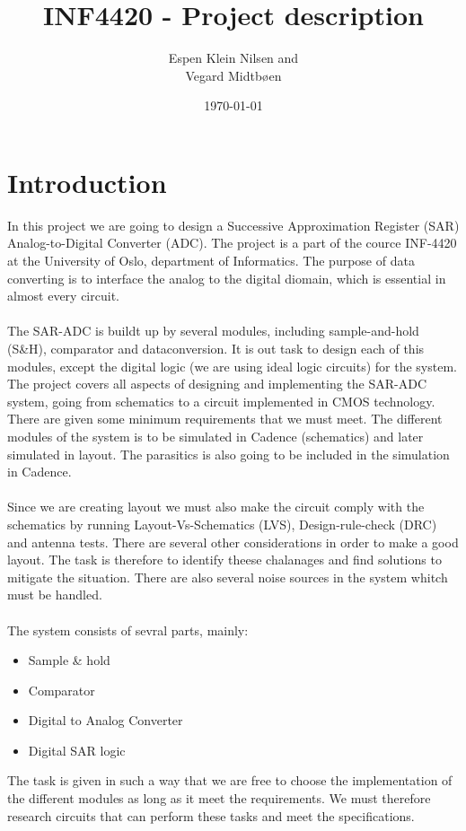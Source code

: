 \documentclass[english, 12pt, a4paper]{article}
\title{INF4420 - Project description}
\author{Espen Klein Nilsen and\\
	Vegard Midtbøen}
\date{\today}
\begin{document}
 \maketitle
 
\section*{Introduction}
In this project we are going to design a Successive Approximation Register (SAR) Analog-to-Digital Converter (ADC). The project is a part 
of the cource INF-4420 at the University of Oslo, department of Informatics. The purpose of data converting is to interface the analog to the 
digital diomain, which is essential in almost every circuit.\\
\\
The SAR-ADC is buildt up by several modules, including sample-and-hold (S\&H), comparator and dataconversion. It is out task to design each of this modules, except the digital logic 
(we are using ideal logic circuits) for the system. The project covers all aspects of designing and implementing the SAR-ADC system, going from schematics to a circuit implemented in 
CMOS technology. There are given some minimum requirements that we must meet. The different modules of the system is to be simulated in Cadence (schematics) and later simulated in layout. 
The parasitics is also going to be included in the simulation in Cadence.\\
\\
Since we are creating layout we must also make the circuit comply with the schematics by running Layout-Vs-Schematics (LVS), Design-rule-check (DRC) and antenna tests. 
There are several other considerations in order to make a good layout. The task is therefore to identify theese chalanages and find solutions to mitigate the situation. 
There are also several noise sources in the system whitch must be handled.\\
\\
The system consists of sevral parts, mainly:
\begin{itemize}
 \item Sample \& hold
 \item Comparator
 \item Digital to Analog Converter
 \item Digital SAR logic
\end{itemize}
The task is given in such a way that we are free to choose the implementation of the different modules as long as it meet the requirements. 
We must therefore research circuits that can perform these tasks and meet the specifications. 
\end{document}
